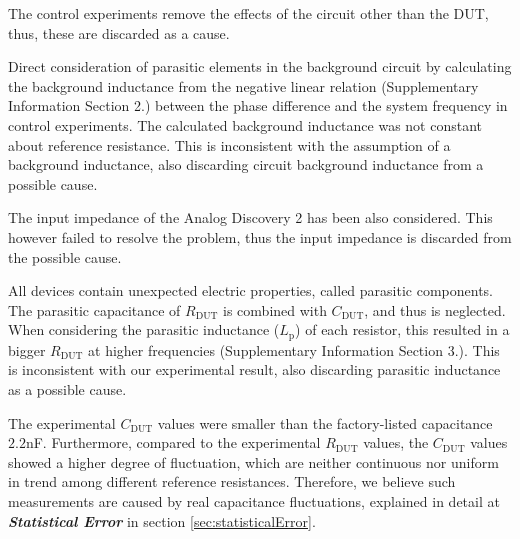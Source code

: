 \documentclass[%
 aip,
 amsmath,amssymb,
 reprint,%
]{revtex4-1}
\begin{document}
 The control experiments remove the effects of the circuit other than the DUT, thus, these are discarded as a cause.

 Direct consideration of parasitic elements in the background circuit by calculating the background inductance from the negative linear relation (Supplementary Information Section 2.) between the phase difference and the system frequency in control experiments. The calculated background inductance was not constant about reference resistance. This is inconsistent with the assumption of a background inductance, also discarding circuit background inductance from a possible cause.

 The input impedance of the Analog Discovery 2 has been also considered. This however failed to resolve the problem, thus the input impedance is discarded from the possible cause.

All devices contain unexpected electric properties, called parasitic components\cite{parasite}. The parasitic capacitance of $R_{\textrm{DUT}}$ is combined with $C_{\textrm{DUT}}$, and thus is neglected. When considering the parasitic inductance ($L_{\textrm{p}}$) of each resistor, this resulted in a bigger $R_{\textrm{DUT}}$ at higher frequencies (Supplementary Information Section 3.). This is inconsistent with our experimental result, also discarding parasitic inductance as a possible cause.

 The experimental $C_{\textrm{DUT}}$ values were smaller than the factory-listed capacitance $2.2$nF. Furthermore, compared to the experimental $R_{\textrm{DUT}}$ values, the $C_{\textrm{DUT}}$ values showed a higher degree of fluctuation, which are neither continuous nor uniform in trend among different reference resistances. Therefore, we believe such measurements are caused by real capacitance fluctuations, explained in detail at \textbf{\textit{\textsf{Statistical Error}}} in section \ref{sec:statisticalError}.
\end{document}
